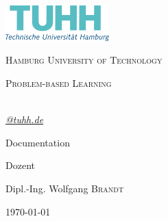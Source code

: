 \begin{titlepage}
	\centering
	\includegraphics[width=0.30\textwidth]{pictures/office_rgb_de.png}\par\vspace{1cm}
	{\scshape\LARGE Hamburg University of Technology \par}
	\vspace{1cm}
	{\scshape\Large Problem-based Learning\par}
	\vspace{1.5cm}
	{\huge\bfseries \thetitle\par}
	\vspace{2cm}
	{\Large\itshape \theauthor\\\href{mailto:@tuhh.de}{@tuhh.de}\par}
	
	\vfill	%
	Documentation\par	%
	
	\vfill	%
	Dozent\par
	Dipl.-Ing. Wolfgang \textsc{Brandt}

	\vfill

	{\large \today\par}
\end{titlepage}


